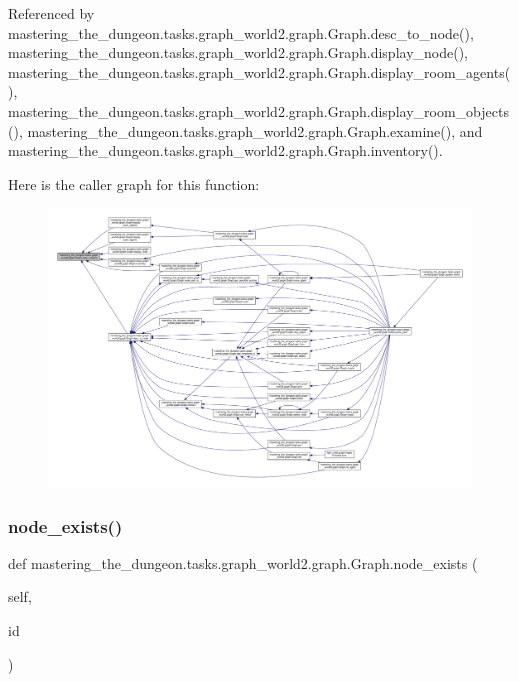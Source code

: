 Referenced by mastering\+\_\+the\+\_\+dungeon.\+tasks.\+graph\+\_\+world2.\+graph.\+Graph.\+desc\+\_\+to\+\_\+node(), mastering\+\_\+the\+\_\+dungeon.\+tasks.\+graph\+\_\+world2.\+graph.\+Graph.\+display\+\_\+node(), mastering\+\_\+the\+\_\+dungeon.\+tasks.\+graph\+\_\+world2.\+graph.\+Graph.\+display\+\_\+room\+\_\+agents(), mastering\+\_\+the\+\_\+dungeon.\+tasks.\+graph\+\_\+world2.\+graph.\+Graph.\+display\+\_\+room\+\_\+objects(), mastering\+\_\+the\+\_\+dungeon.\+tasks.\+graph\+\_\+world2.\+graph.\+Graph.\+examine(), and mastering\+\_\+the\+\_\+dungeon.\+tasks.\+graph\+\_\+world2.\+graph.\+Graph.\+inventory().

Here is the caller graph for this function\+:
\nopagebreak
\begin{figure}[H]
\begin{center}
\leavevmode
\includegraphics[width=350pt]{classmastering__the__dungeon_1_1tasks_1_1graph__world2_1_1graph_1_1Graph_ab86314e0d6d56dae57a5072c4f9b749f_icgraph}
\end{center}
\end{figure}
\mbox{\label{classmastering__the__dungeon_1_1tasks_1_1graph__world2_1_1graph_1_1Graph_a04d9e981dfe42dd636a17e808f7821cc}} 
\subsubsection{\texorpdfstring{node\+\_\+exists()}{node\_exists()}}
{\footnotesize\ttfamily def mastering\+\_\+the\+\_\+dungeon.\+tasks.\+graph\+\_\+world2.\+graph.\+Graph.\+node\+\_\+exists (\begin{DoxyParamCaption}\item[{}]{self,  }\item[{}]{id }\end{DoxyParamCaption})}



